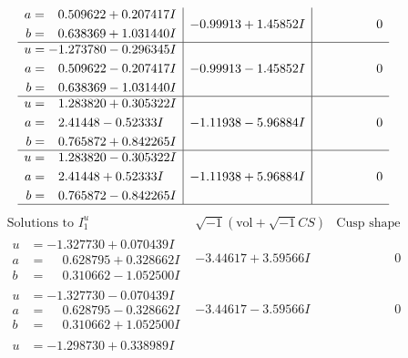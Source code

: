 \documentclass[1p]{elsarticle_modified}
\theoremstyle{definition}
\newcommand{\I}{\sqrt{-1}}
\begin{document}
$$\begin{array}{c|c|c}
\begin{aligned}
a &= \phantom{-}0.509622 + 0.207417 I \\
b &= \phantom{-}0.638369 + 1.031440 I\end{aligned}
 & -0.99913 + 1.45852 I & \phantom{-0.000000 } 0 \\ \hline\begin{aligned}
u &= -1.273780 - 0.296345 I \\
a &= \phantom{-}0.509622 - 0.207417 I \\
b &= \phantom{-}0.638369 - 1.031440 I\end{aligned}
 & -0.99913 - 1.45852 I & \phantom{-0.000000 } 0 \\ \hline\begin{aligned}
u &= \phantom{-}1.283820 + 0.305322 I \\
a &= \phantom{-}2.41448 - 0.52333 I \\
b &= \phantom{-}0.765872 + 0.842265 I\end{aligned}
 & -1.11938 - 5.96884 I & \phantom{-0.000000 } 0 \\ \hline\begin{aligned}
u &= \phantom{-}1.283820 - 0.305322 I \\
a &= \phantom{-}2.41448 + 0.52333 I \\
b &= \phantom{-}0.765872 - 0.842265 I\end{aligned}
 & -1.11938 + 5.96884 I & \phantom{-0.000000 } 0\\
 \hline 
 \end{array}$$\newpage$$\begin{array}{c|c|c}  
\text{Solutions to }I^u_{1}& \I (\text{vol} + \sqrt{-1}CS) & \text{Cusp shape}\\
 \hline 
\begin{aligned}
u &= -1.327730 + 0.070439 I \\
a &= \phantom{-}0.628795 + 0.328662 I \\
b &= \phantom{-}0.310662 - 1.052500 I\end{aligned}
 & -3.44617 + 3.59566 I & \phantom{-0.000000 } 0 \\ \hline\begin{aligned}
u &= -1.327730 - 0.070439 I \\
a &= \phantom{-}0.628795 - 0.328662 I \\
b &= \phantom{-}0.310662 + 1.052500 I\end{aligned}
 & -3.44617 - 3.59566 I & \phantom{-0.000000 } 0 \\ \hline\begin{aligned}
u &= -1.298730 + 0.338989 I \\

\end{aligned}
\end{array}$$
\end{document}
